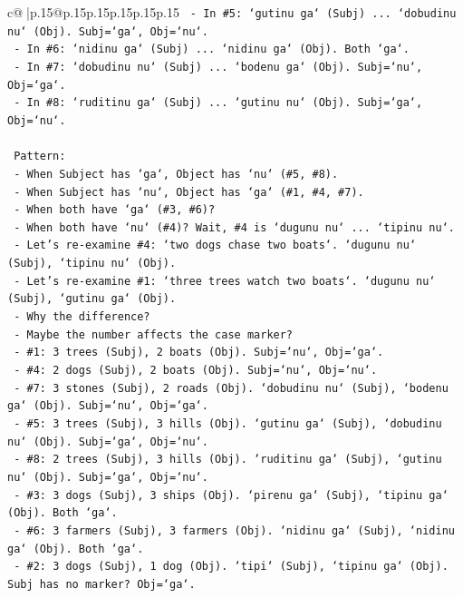 \documentclass{article}
\begin{document}
{\begin{supertabular}{c@{$\;$}|p{.15\linewidth}@{}p{.15\linewidth}p{.15\linewidth}p{.15\linewidth}p{.15\linewidth}p{.15\linewidth}}
{{{\texttt{   {-} In \#5: `gutinu ga` (Subj) ... `dobudinu nu` (Obj). Subj=`ga`, Obj=`nu`.} \\
\texttt{   {-} In \#6: `nidinu ga` (Subj) ... `nidinu ga` (Obj). Both `ga`.} \\
\texttt{   {-} In \#7: `dobudinu nu` (Subj) ... `bodenu ga` (Obj). Subj=`nu`, Obj=`ga`.} \\
\texttt{   {-} In \#8: `ruditinu ga` (Subj) ... `gutinu nu` (Obj). Subj=`ga`, Obj=`nu`.} \\
\\ 
\texttt{   Pattern:} \\
\texttt{   {-} When Subject has `ga`, Object has `nu` (\#5, \#8).} \\
\texttt{   {-} When Subject has `nu`, Object has `ga` (\#1, \#4, \#7).} \\
\texttt{   {-} When both have `ga` (\#3, \#6)?} \\
\texttt{   {-} When both have `nu` (\#4)? Wait, \#4 is `dugunu nu` ... `tipinu nu`.} \\
\texttt{   {-} Let's re{-}examine \#4: `two dogs chase two boats`. `dugunu nu` (Subj), `tipinu nu` (Obj).} \\
\texttt{   {-} Let's re{-}examine \#1: `three trees watch two boats`. `dugunu nu` (Subj), `gutinu ga` (Obj).} \\
\texttt{   {-} Why the difference?} \\
\texttt{   {-} Maybe the number affects the case marker?} \\
\texttt{   {-} \#1: 3 trees (Subj), 2 boats (Obj). Subj=`nu`, Obj=`ga`.} \\
\texttt{   {-} \#4: 2 dogs (Subj), 2 boats (Obj). Subj=`nu`, Obj=`nu`.} \\
\texttt{   {-} \#7: 3 stones (Subj), 2 roads (Obj). `dobudinu nu` (Subj), `bodenu ga` (Obj). Subj=`nu`, Obj=`ga`.} \\
\texttt{   {-} \#5: 3 trees (Subj), 3 hills (Obj). `gutinu ga` (Subj), `dobudinu nu` (Obj). Subj=`ga`, Obj=`nu`.} \\
\texttt{   {-} \#8: 2 trees (Subj), 3 hills (Obj). `ruditinu ga` (Subj), `gutinu nu` (Obj). Subj=`ga`, Obj=`nu`.} \\
\texttt{   {-} \#3: 3 dogs (Subj), 3 ships (Obj). `pirenu ga` (Subj), `tipinu ga` (Obj). Both `ga`.} \\
\texttt{   {-} \#6: 3 farmers (Subj), 3 farmers (Obj). `nidinu ga` (Subj), `nidinu ga` (Obj). Both `ga`.} \\
\texttt{   {-} \#2: 3 dogs (Subj), 1 dog (Obj). `tipi` (Subj), `tipinu ga` (Obj). Subj has no marker? Obj=`ga`.} \\
}}}
\end{supertabular}}
\end{document}
